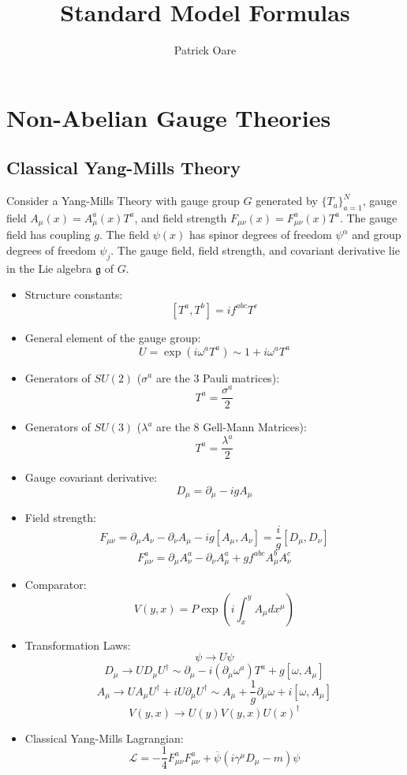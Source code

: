 \documentclass[11pt, oneside]{article}   	%
\title{Standard Model Formulas}
\author{Patrick Oare}
\date{}							%
\theoremstyle{definition}
\begin{document}
\maketitle

\section*{Non-Abelian Gauge Theories}

\subsection*{Classical Yang-Mills Theory}

Consider a Yang-Mills Theory with gauge group $G$ generated by $\{T_a\}_{a = 1}^N$, gauge field $A_\mu(x) = 
A_\mu^a(x)T^a$, and field strength $F_{\mu\nu}(x) = F_{\mu\nu}^a(x)T^a$. The gauge field has coupling $g$. The field 
$\psi(x)$ has spinor degrees of freedom $\psi^\alpha$ and group degrees of freedom $\psi_j$. The gauge field, field strength, 
and covariant derivative lie in the Lie algebra $\mathfrak g$ of $G$. 

\begin{itemize}

	\item Structure constants:
	$$
		[T^a, T^b] = if^{abc} T^c
	$$
	
	\item General element of the gauge group:
	$$
		U = \exp(i\omega^a T^a)\sim 1 + i\omega^a T^a
	$$
	
	\item Generators of $SU(2)$ ($\sigma^a$ are the 3 Pauli matrices):
	$$
		T^a = \frac{\sigma^a}{2}
	$$
	
	\item Generators of $SU(3)$ ($\lambda^a$ are the 8 Gell-Mann Matrices):
	$$
		T^a = \frac{\lambda^a}{2}
	$$
	
	\item Gauge covariant derivative:
	$$
		D_\mu = \partial_\mu - ig A_\mu
	$$
	
	\item Field strength:
	$$
		F_{\mu\nu} = \partial_\mu A_\nu - \partial_\nu A_\mu - ig [A_\mu, A_\nu] = \frac{i}{g} [D_\mu, D_\nu]
	$$
	$$
		F_{\mu\nu}^a = \partial_\mu A_\nu^a - \partial_\nu A_\mu^a + gf^{abc}A_\mu^b A_\nu^c
	$$
	
	\item Comparator:
	$$
		V(y, x) = P\exp\left(i\int_x^y A_\mu dx^\mu\right)
	$$
	
	\item Transformation Laws:
	$$
		\psi\rightarrow U\psi
	$$
	$$
		D_\mu\rightarrow UD_\mu U^\dagger\sim \partial_\mu - i (\partial_\mu\omega^a)T^a + g[\omega, A_\mu]
	$$
	$$
		A_\mu\rightarrow U A_\mu U^\dagger + i U\partial_\mu U^\dagger\sim A_\mu + \frac{1}{g}\partial_\mu\omega + 
		i [\omega, A_\mu]
	$$
	$$
		V(y, x)\rightarrow U(y)V(y, x)U(x)^\dagger
	$$
	
	\item Classical Yang-Mills Lagrangian:
	$$
		\mathcal L = -\frac{1}{4}F_{\mu\nu}^a F_{\mu\nu}^a + \overline\psi\left(i\gamma^\mu D_\mu - m\right)\psi
	$$

\end{itemize}
\end{document}
